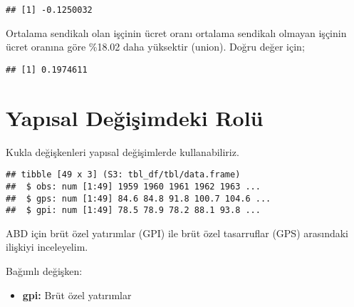 \documentclass[
]{book}
\newenvironment{Shaded}{\begin{snugshade}}{\end{snugshade}}
\newcommand{\CommentTok}[1]{\textcolor[rgb]{0.56,0.35,0.01}{\textit{#1}}}
\newcommand{\DecValTok}[1]{\textcolor[rgb]{0.00,0.00,0.81}{#1}}
\newcommand{\KeywordTok}[1]{\textcolor[rgb]{0.13,0.29,0.53}{\textbf{#1}}}
\newcommand{\NormalTok}[1]{#1}
\newcommand{\OperatorTok}[1]{\textcolor[rgb]{0.81,0.36,0.00}{\textbf{#1}}}
\newcommand{\StringTok}[1]{\textcolor[rgb]{0.31,0.60,0.02}{#1}}
\providecommand{\tightlist}{%
  \setlength{\itemsep}{0pt}\setlength{\parskip}{0pt}}
\begin{document}
\begin{verbatim}
## [1] -0.1250032
\end{verbatim}

Ortalama sendikalı olan işçinin ücret oranı ortalama sendikalı olmayan işçinin ücret oranına göre \%18.02 daha yüksektir (union). Doğru değer için;

\begin{Shaded}
\end{Shaded}

\begin{verbatim}
## [1] 0.1974611
\end{verbatim}

\hypertarget{yapux131sal-deux11fiux15fimdeki-roluxfc}{%
\section{Yapısal Değişimdeki Rolü}\label{yapux131sal-deux11fiux15fimdeki-roluxfc}}

Kukla değişkenleri yapısal değişimlerde kullanabiliriz.

\begin{Shaded}
\end{Shaded}

\begin{verbatim}
## tibble [49 x 3] (S3: tbl_df/tbl/data.frame)
##  $ obs: num [1:49] 1959 1960 1961 1962 1963 ...
##  $ gps: num [1:49] 84.6 84.8 91.8 100.7 104.6 ...
##  $ gpi: num [1:49] 78.5 78.9 78.2 88.1 93.8 ...
\end{verbatim}

ABD için brüt özel yatırımlar (GPI) ile brüt özel tasarruflar (GPS) arasındaki ilişkiyi inceleyelim.

Bağımlı değişken:

\begin{itemize}
\tightlist
\item
  \textbf{gpi:} Brüt özel yatırımlar
\end{itemize}
\end{document}
